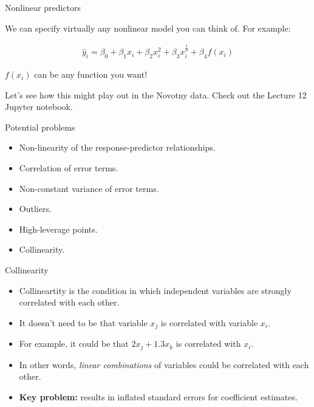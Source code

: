 \documentclass[aspectratio=169]{beamer}
\begin{document}
\begin{frame}{Nonlinear predictors}

We can specify virtually any nonlinear model you can think of. For example:

\begin{align*}
\hat{y}_i = \beta_0 + \beta_1 x_i + \beta_2 x_i^2 + \beta_3 x_i^{\frac{1}{3}} + \beta_4 f(x_i)
\end{align*}

$f(x_i)$ can be any function you want!

\vspace{5mm}
Let's see how this might play out in the Novotny data. Check out the Lecture 12 Jupyter notebook.

\end{frame}

\begin{frame}{Potential problems}
  \begin{itemize}
    \item Non-linearity of the response-predictor relationships. 
    \item Correlation of error terms.
    \item Non-constant variance of error terms.
    \item Outliers.
    \item High-leverage points.
    \item Collinearity.  
  \end{itemize}
\end{frame}

\begin{frame}{Collinearity}

\begin{itemize}
\item Collineartity is the condition in which independent variables are strongly correlated with each other.  
\item It doesn't need to be that variable $x_j$ is correlated with variable $x_i$.  
\item For example, it could be that $2x_j+1.3x_k$ is correlated with $x_i$.
\item In other words, \textit{linear combinations} of variables could be correlated with each other.
\item \textbf{ Key problem: } results in inflated standard errors for coefficient estimates.  

\end{itemize}
\end{frame}
\end{document}

